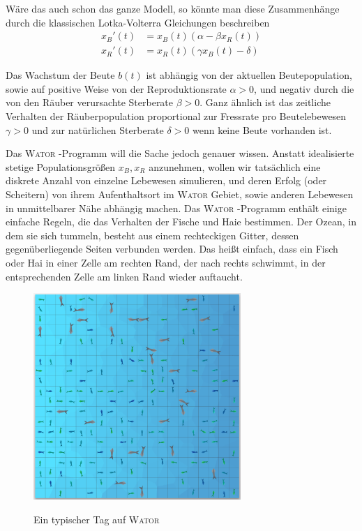 \documentclass[a4paper,11pt]{article}
\newcommand{\wator}{\textsc{Wator }}
\theoremstyle{definition}
\numberwithin{equation}{section}
\begin{document}
	Wäre das auch schon das ganze Modell, so könnte man diese Zusammenhänge durch die klassischen Lotka-Volterra Gleichungen beschreiben
	\begin{align} \label{eq:lotka_volterra}
		x_B'(t) &= x_B(t) \left(\alpha - \beta x_R(t)\right) \\
		x_R'(t) &= x_R(t) \left(\gamma x_B(t) - \delta\right) \nonumber
	\end{align}

	Das Wachstum der Beute $b(t)$ ist abhängig von der aktuellen Beutepopulation, sowie auf positive Weise von der Reproduktionsrate $\alpha > 0$, und negativ durch die von den Räuber verursachte Sterberate $\beta > 0$. Ganz ähnlich ist das zeitliche Verhalten der Räuberpopulation proportional zur Fressrate pro Beutelebewesen $\gamma > 0$ und zur natürlichen Sterberate $\delta > 0$ wenn keine Beute vorhanden ist. \newline

	Das \wator-Programm will die Sache jedoch genauer wissen. Anstatt idealisierte stetige Populationsgrößen $x_B, x_R$ anzunehmen, wollen wir tatsächlich eine diskrete Anzahl von einzelne Lebewesen simulieren, und deren Erfolg (oder Scheitern) von ihrem Aufenthaltsort im \wator Gebiet, sowie anderen Lebewesen in unmittelbarer Nähe abhängig machen. \newline
	Das \wator-Programm enthält einige einfache Regeln, die das Verhalten der Fische und Haie bestimmen. Der Ozean, in dem sie sich tummeln, besteht aus einem rechteckigen Gitter, dessen gegenüberliegende Seiten verbunden werden. Das heißt einfach, dass ein Fisch oder Hai in einer Zelle am rechten Rand, der nach rechts schwimmt, in der entsprechenden Zelle am linken Rand wieder auftaucht.

	\begin{figure}
		\centering
		\includegraphics[width=0.7\textwidth]{pictures/classic.png}
		\label{fig:encounter}
		\caption{Ein typischer Tag auf \wator}
	\end{figure}
\end{document}
